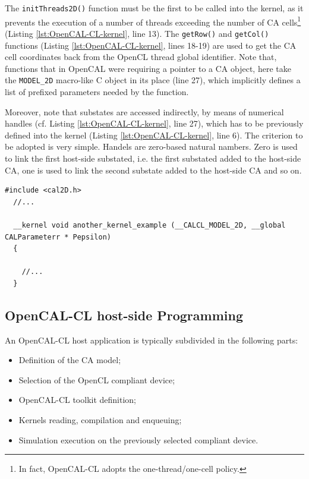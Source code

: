 The \verb'initThreads2D()' function must be the first to be called
into the kernel, as it prevents the execution of a number of threads
exceeding the number of CA cells\footnote{In fact, OpenCAL-CL adopts
  the one-thread/one-cell policy.} (Listing
\ref{lst:OpenCAL-CL-kernel}, line 13). The \verb'getRow()' and
\verb'getCol()' functions (Listing \ref{lst:OpenCAL-CL-kernel}, lines
18-19) are used to get the CA cell coordinates back from the OpenCL
thread global identifier. Note that, functions that in OpenCAL were
requiring a pointer to a CA object, here take the \verb'MODEL_2D'
macro-like C object in its place (line 27), which implicitly defines a
list of prefixed parameters needed by the function.

Moreover, note that substates are accessed indirectly, by means of
numerical handles (cf. Listing \ref{lst:OpenCAL-CL-kernel}, line 27),
which has to be previously defined into the kernel (Listing
\ref{lst:OpenCAL-CL-kernel}, line 6). The criterion to be adopted is
very simple. Handels are zero-based natural nambers. Zero is used to
link the first host-side substated, i.e. the first substated added to
the host-side CA, one is used to link the second substate added to the
host-side CA and so on.

\begin{lstlisting}[float,floatplacement=H, label=lst:Another-OpenCAL-CL-kernel, caption={Another example of OpenCAL-CL kernel, with an additional parameter.}] 
  #include <cal2D.h>
  //...
    
  __kernel void another_kernel_example (__CALCL_MODEL_2D, __global CALParameterr * Pepsilon)
  {
    
    //...
  }
\end{lstlisting}



\subsection{OpenCAL-CL host-side Programming}

An OpenCAL-CL host application is typically
subdivided in the following parts:
\begin{itemize}
\item Definition of the CA model;
\item Selection of the OpenCL compliant device;
\item OpenCAL-CL toolkit definition;
\item Kernels reading, compilation and enqueuing;
\item Simulation execution on the previously selected compliant
  device.
\end{itemize}

